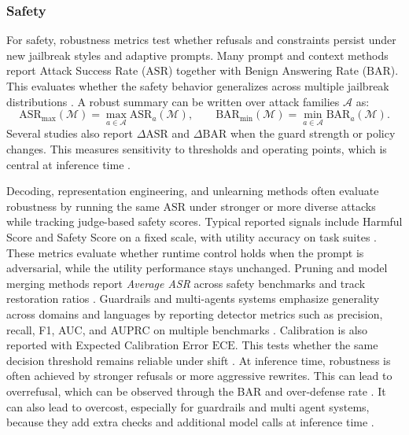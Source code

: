 \subsubsection{Safety}
For safety, robustness metrics test whether refusals and constraints persist under new jailbreak styles and adaptive prompts.
Many prompt and context methods report Attack Success Rate ($\mathrm{ASR}$) together with Benign Answering Rate ($\mathrm{BAR}$). This evaluates whether the safety behavior generalizes across multiple jailbreak distributions \citep{kumar2024certifying, cao2024defending, zhou2024defending}.
A robust summary can be written over attack families $\mathcal{A}$ as:
\[
\mathrm{ASR}_{\max}(\mathcal{M})
=
\max_{a\in\mathcal{A}} \mathrm{ASR}_a(\mathcal{M}),
\qquad
\mathrm{BAR}_{\min}(\mathcal{M})
=
\min_{a\in\mathcal{A}} \mathrm{BAR}_a(\mathcal{M}).
\]
Several studies also report $\Delta \mathrm{ASR}$ and $\Delta \mathrm{BAR}$ when the guard strength or policy changes.
This measures sensitivity to thresholds and operating points, which is central at inference time \citep{DBLP:journals/corr/abs-2504-00441}.

Decoding, representation engineering, and unlearning methods often evaluate robustness by running the same $\mathrm{ASR}$ under stronger or more diverse attacks while tracking judge-based safety scores. \citep{deng2025guard, yan2025dual}
Typical reported signals include Harmful Score and Safety Score on a fixed scale, with utility accuracy on task suites \citep{Xu2024SafeDecodingDA, Wang2024InferAligner, Gallego2025MetaSCTS}.
These metrics evaluate whether runtime control holds when the prompt is adversarial, while the utility performance stays unchanged. Pruning and model merging methods report \emph{Average ASR} across safety benchmarks and track restoration ratios \citep{li-etal-2025-hierarchical, djuhera2025safemerge, DBLP:journals/corr/abs-2412-19512}. Guardrails and multi-agents systems emphasize generality across domains and languages by reporting detector metrics such as precision, recall, F1, AUC, and AUPRC on multiple benchmarks \citep{Inan2023LlamaGL, Padhi2024GraniteG, Upadhayay2025XGuardMG, Ghosh2024AEGISOA, asad2025reddebatesaferresponsesmultiagent}.
Calibration is also reported with Expected Calibration Error $\mathrm{ECE}$.
This tests whether the same decision threshold remains reliable under shift \citep{DBLP:conf/iclr/0002HGWW25, DBLP:conf/acl/FengS00BT24}. At inference time, robustness is often achieved by stronger refusals or more aggressive rewrites.
This can lead to overrefusal, which can be observed through the BAR and over-defense rate \citep{cao2024defending, zhou2024defending}.
It can also lead to overcost, especially for guardrails and multi agent systems, because they add extra checks and additional model calls at inference time \citep{DBLP:conf/icml/LiGZFL25, Sharma2025ConstitutionalCD, lakara2025llmconsensusmultiagentdebatevisual, song2024auditllmmultiagentcollaborationlogbased}.


